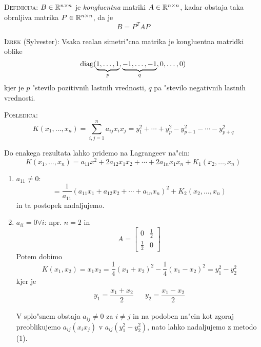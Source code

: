 \textsc{Definicija:} $B \in \mathbb{R}^{n \times n}$ je \emph{kongluentna} matriki $A \in \mathbb{R}^{n \times n}$, kadar obstaja taka obrnljiva matrika $P \in \mathbb{R}^{n \times n}$, da je 
\begin{equation*}
B = P^T AP
\end{equation*}

\textsc{Izrek} (Sylvester): Vsaka realan simetri"cna matrika je kongluentna matridki oblike
\begin{equation*}
\operatorname{diag} (\underbrace{1, \ldots, 1}_p, \underbrace{-1, \ldots, -1}_q, 0, \ldots, 0)
\end{equation*}
kjer je $p$ "stevilo pozitivnih lastnih vrednosti, $q$ pa "stevilo negativnih lastnih vrednosti.

\textsc{Posledica:}
\begin{equation*}
K(x_1, \ldots, x_n) = \sum_{i, j =1}^n a_{ij} x_i x_j = y_1^2 + \cdots + y_p^2 - y_{p+1}^2 - \cdots - y_{p+q}^2
\end{equation*}

Do enakega rezultata lahko pridemo na Lagrangeev na"cin:
\begin{equation*}
K(x_1, \ldots, x_n) = a_{11} x^2 + 2 a_{12} x_1 x_2 + \cdots + 2 a_{1n} x_1 x_n + K_1(x_2, \ldots, x_n)
\end{equation*}
\begin{enumerate}
    \item $a_{11} \neq 0$:
    \begin{equation*}
    = \dfrac{1}{a_{11}} (a_{11} x_1 + a_{12} x_2 + \cdots + a_{1n} x_n)^2 + K_2(x_2, \ldots, x_n)
    \end{equation*}
    in ta postopek nadaljujemo.
    
    \item $a_{ii} = 0 \forall i$: npr. $n = 2$ in
    \begin{equation*}
    A = \begin{bmatrix}
    0 & \frac{1}{2} \\
    \frac{1}{2} & 0
    \end{bmatrix}
    \end{equation*}
    Potem dobimo
    \begin{equation*}
    K(x_1, x_2) = x_1 x_2 = \dfrac{1}{4} (x_1 + x_2)^2 - \dfrac{1}{4} (x_1 - x_2)^2 = y_1^2 - y_2^2
    \end{equation*}
    kjer je
    \begin{align*}
    y_1 = \dfrac{x_1 + x_2}{2} && y_2 = \dfrac{x_1 - x_2}{2}
    \end{align*}
    
    V splo"snem obstaja $a_{ij} \neq 0$ za $i \neq j$ in na podoben na"cin kot zgoraj preoblikujemo $a_{ij} (x_i x_j)$ v $a_{ij} (y_1^2 - y_2^2)$, nato lahko nadaljujemo z metodo (1).
\end{enumerate}


